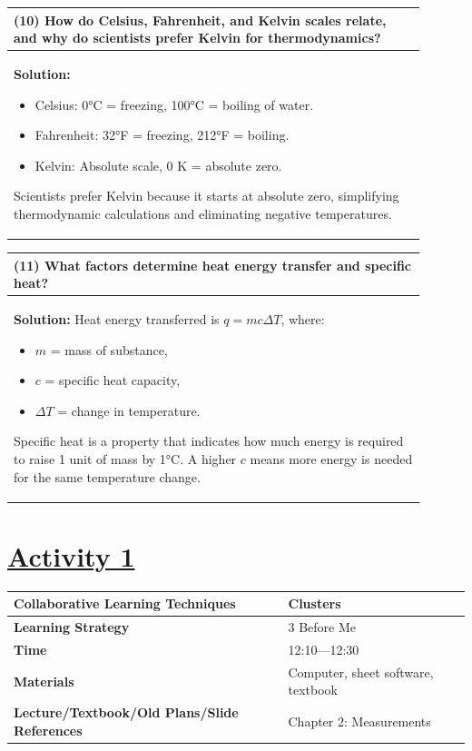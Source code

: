 \documentclass{article}
\begin{document}
\begin{tabular}{|p{0.9\linewidth}|}
\hline
\textbf{(10) How do Celsius, Fahrenheit, and Kelvin scales relate, and why do scientists prefer Kelvin for thermodynamics?} \\ \hline
\textbf{Solution:} 
\begin{itemize}
    \item Celsius: 0°C = freezing, 100°C = boiling of water.  
    \item Fahrenheit: 32°F = freezing, 212°F = boiling.  
    \item Kelvin: Absolute scale, 0 K = absolute zero.  
\end{itemize}
Scientists prefer Kelvin because it starts at absolute zero, simplifying thermodynamic calculations and eliminating negative temperatures. \\ \hline
\end{tabular}
\newpage

\begin{tabular}{|p{0.9\linewidth}|}
\hline
\textbf{(11) What factors determine heat energy transfer and specific heat?} \\ \hline
\textbf{Solution:} Heat energy transferred is $q = m c \Delta T$, where:
\begin{itemize}
    \item $m$ = mass of substance,  
    \item $c$ = specific heat capacity,  
    \item $\Delta T$ = change in temperature.  
\end{itemize}
Specific heat is a property that indicates how much energy is required to raise 1 unit of mass by 1°C. A higher $c$ means more energy is needed for the same temperature change. \\ \hline
\end{tabular}
\newpage

\section*{\underline{Activity 1}}
\begin{tabular}{|p{4.2cm}|p{9.8cm}|}
\hline
\textbf{Collaborative Learning Techniques} & Clusters \\
\hline
\textbf{Learning Strategy} & 3 Before Me \\
\hline
\textbf{Time} & 12:10---12:30 \\
\hline
\textbf{Materials} & Computer, sheet software, textbook \\
\hline
\textbf{Lecture/Textbook/Old Plans/Slide References} & Chapter 2: Measurements \\
\hline
\end{tabular}
\end{document}

